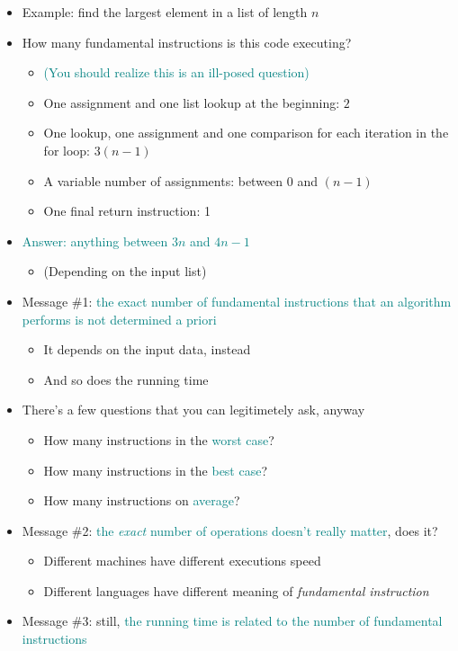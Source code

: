   \begin{itemize}
  \item Example: find the largest element in a list of length $n$
  \item How many fundamental instructions is this code executing?
    \begin{itemize}
    \item \textcolor{teal}{(You should realize this is an ill-posed question)}
    \item One assignment and one list lookup at the beginning: $2$
    \item One lookup, one assignment and one comparison for each iteration
      in the for loop: $3(n - 1)$
    \item A variable number of assignments: between $0$ and $(n - 1)$
    \item One final return instruction: 1
    \end{itemize}
  \item \textcolor{teal}{Answer: anything between $3n$ and $4n - 1$}
    \begin{itemize}
    \item (Depending on the input list)
    \end{itemize}
  \end{itemize}

\begin{itemize}
  \item Message \#1: \textcolor{teal}{the exact number of fundamental instructions that an
    algorithm performs is not determined a priori}
    \begin{itemize}
    \item It depends on the input data, instead
    \item And so does the running time
    \end{itemize}
  \item There's a few questions that you can legitimetely ask, anyway
    \begin{itemize}
    \item How many instructions in the \textcolor{teal}{worst case}?
    \item How many instructions in the \textcolor{teal}{best case}?
    \item How many instructions on \textcolor{teal}{average}?
    \end{itemize}
  \item Message \#2: \textcolor{teal}{the \emph{exact} number of operations doesn't really
    matter}, does it?
    \begin{itemize}
    \item Different machines have different executions speed
    \item Different languages have different meaning of
      \emph{fundamental instruction}
    \end{itemize}
  \item Message \#3: still, \textcolor{teal}{the running time is related to the number
  of fundamental instructions}
  \end{itemize}

